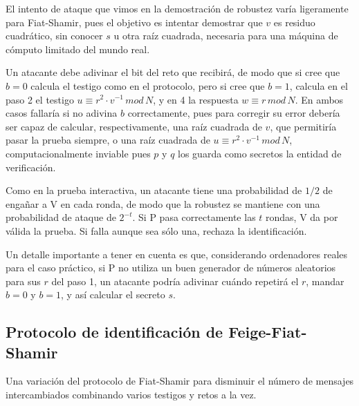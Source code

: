 \hfil

El intento de ataque que vimos en la demostración de robustez varía ligeramente para Fiat-Shamir, pues el objetivo es intentar demostrar que $v$ es residuo cuadrático, sin conocer $s$ u otra raíz cuadrada, necesaria para una máquina de cómputo limitado del mundo real.

Un atacante debe adivinar el bit del reto que recibirá, de modo que si cree que $b=0$ calcula el testigo como en el protocolo, pero si cree que $b=1$, calcula en el paso 2 el testigo $u \equiv r^2\cdot v^{-1} \, mod \, N$, y en 4 la respuesta $w \equiv r \, mod \, N$. En ambos casos fallaría si no adivina $b$ correctamente, pues para corregir su error debería ser capaz de calcular, respectivamente, una raíz cuadrada de $v$, que permitiría pasar la prueba siempre, o una raíz cuadrada de $u \equiv r^2\cdot v^{-1} \, mod \, N$, computacionalmente inviable pues $p$ y $q$ los guarda como secretos la entidad de verificación.

Como en la prueba interactiva, un atacante tiene una probabilidad de $1/2$ de engañar a V en cada ronda, de modo que la robustez se mantiene con una probabilidad de ataque de $2^{-t}$. Si P pasa correctamente las $t$ rondas, V da por válida la prueba. Si falla aunque sea sólo una, rechaza la identificación.

\hfil

Un detalle importante a tener en cuenta es que, considerando ordenadores reales para el caso práctico, si P no utiliza un buen generador de números aleatorios para sus $r$ del paso 1, un atacante podría adivinar cuándo repetirá el $r$, mandar $b=0$ y $b=1$, y así calcular el secreto $s$.



\subsection{Protocolo de identificación de Feige-Fiat-Shamir}


Una variación del protocolo de Fiat-Shamir para disminuir el número de mensajes intercambiados combinando varios testigos y retos a la vez.

